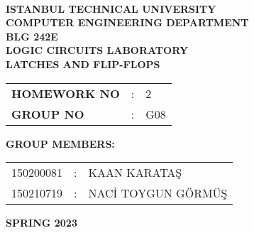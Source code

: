 \documentclass[pdftex,12pt,a4paper]{article}
\begin{document}
\begin{titlepage}
\begin{center}
\textbf{}\\
\textbf{\Large{ISTANBUL TECHNICAL UNIVERSITY}}\\
\vspace{0.5cm}
\textbf{\Large{COMPUTER ENGINEERING DEPARTMENT}}\\
\vspace{2cm}
\textbf{\Large{BLG 242E}}\\
\vspace{0.2cm}
\textbf{\Large{LOGIC CIRCUITS LABORATORY}}\\
\vspace{0.2cm}
\textbf{\Large{LATCHES AND FLIP-FLOPS}}\\
\vspace{2cm}
\begin{table}[ht]
\centering
\Large{
\begin{tabular}{lcl}
\textbf{HOMEWORK NO}  & : & 2 \\
\textbf{GROUP NO}  & : & G08 \\
\end{tabular}}\end{table}\vspace{1cm}
\textbf{\Large{GROUP MEMBERS:}}\\
\begin{table}[ht]\centering\Large{
\begin{tabular}{rcl}
150200081  & : & KAAN KARATAŞ \\
150210719  & : & NACİ TOYGUN GÖRMÜŞ \\
\end{tabular}}
\end{table}
\vspace{2.8cm}
\textbf{\Large{SPRING 2023}}
\end{center}
\end{titlepage}
\end{document}
